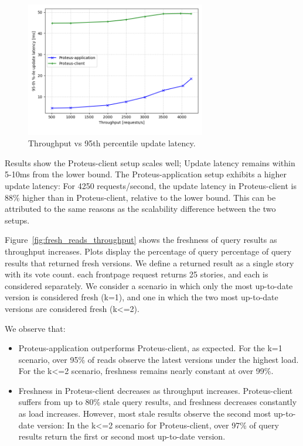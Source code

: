 \begin{figure}
\centering
  \includegraphics[width=0.7\textwidth]{./figures/evaluation/fr_latency_throughput.png}
  \caption{Throughput vs 95th percentile update latency.}
  \label{fig:fr_latency_throughput}
\end{figure}

Results show the Proteus-client setup scales well; Update latency remains within 5-10ms from the lower bound.
The Proteus-application setup exhibits a higher update latency:
For 4250 requests/second, the update latency in Proteus-client is 88\% higher than in Proteus-client, relative to the lower bound.
This can be attributed to the same reasons as the scalability difference between the two setups.

\bigskip
\noindent
Figure~\ref{fig:fresh_reads_throughput} shows the freshness of query results as throughput increases.
Plots display the percentage of query percentage of query results that returned fresh versions.
We define a returned result as a single story with its vote count.
each frontpage request returns 25 stories, and each is considered separately.
We consider a scenario in which only the most up-to-date version is considered fresh (k=1),
and one in which the two most up-to-date versions are considered fresh (k<=2).

We observe that:
\begin{itemize}
  \item Proteus-application outperforms Proteus-client, as expected.
  For the k=1 scenario, over 95\% of reads observe the latest versions under the highest load.
  For the k<=2 scenario, freshness remains nearly constant at over 99\%.
  \item Freshness in Proteus-client decreases as throughput increases.
  Proteus-client suffers from up to 80\% stale query results, and freshness decreases constantly as load increases.
  However, most stale results observe the second most up-to-date version:
  In the k<=2 scenario for Proteus-client, over 97\% of query results return the first or second most up-to-date version.
\end{itemize}

